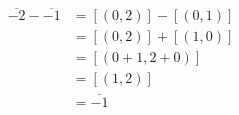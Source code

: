 \documentclass[preview]{standalone}
\begin{document}
\begin{align*}
\overline{-2} - \overline{-1} &= \left[(0, 2)\right] - \left[(0, 1)\right] \\ &= \left[(0, 2)\right] + \left[(1, 0)\right] \\ &= \left[(0 + 1, 2 + 0)\right] \\ &= \left[(1, 2)\right] \\ &= \overline{-1} \\
\end{align*}
\end{document}
